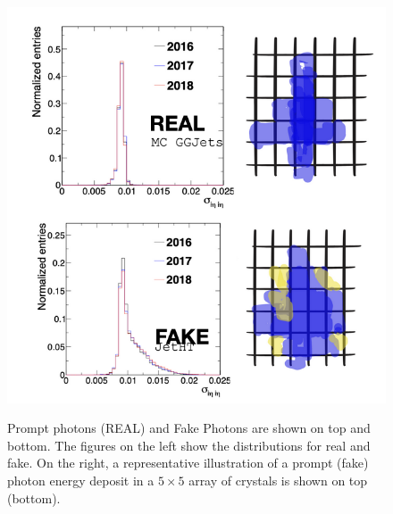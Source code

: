 \begin{figure}[!htbp]
	\centering
     \caption{Prompt photons (REAL) and Fake Photons are shown on top and bottom. The figures on the left show the \sieie distributions for real and fake. On the right, a representative illustration of a prompt (fake) photon energy deposit in a $5 \times 5$ array of crystals is shown on top (bottom).}
	\includegraphics[scale=0.9]{fig/PromptPhotonsVsFakes.png}
	\label{fig:PromptPhotonsVsFakes}
\end{figure}

